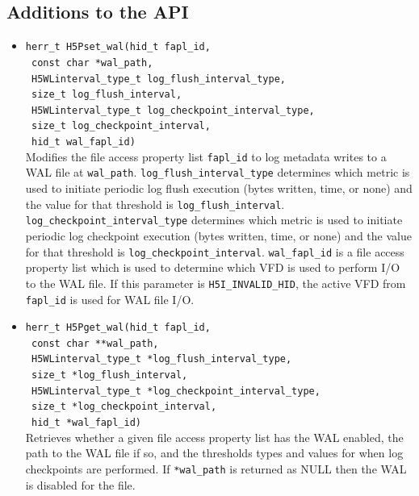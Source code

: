\subsection{Additions to the API}

\begin{itemize}
    \item \texttt{herr\_t H5Pset\_wal(hid\_t fapl\_id,} \\
    \texttt{ const char *wal\_path,} \\
    \texttt{ H5WLinterval\_type\_t log\_flush\_interval\_type,} \\
    \texttt{ size\_t log\_flush\_interval,} \\
    \texttt{ H5WLinterval\_type\_t log\_checkpoint\_interval\_type,} \\
    \texttt{ size\_t log\_checkpoint\_interval,} \\
    \texttt{ hid\_t wal\_fapl\_id)} \\
    Modifies the file access property list \texttt{fapl\_id} to log metadata writes to a WAL file at \texttt{wal\_path}. \texttt{log\_flush\_interval\_type} determines which metric is used to initiate periodic log flush execution (bytes written, time, or none) and the value for that threshold is \texttt{log\_flush\_interval}. \texttt{log\_checkpoint\_interval\_type} determines which metric is used to initiate periodic log checkpoint execution (bytes written, time, or none) and the value for that threshold is \texttt{log\_checkpoint\_interval}. \texttt{wal\_fapl\_id} is a file access property list which is used to determine which VFD is used to perform I/O to the WAL file. If this parameter is \texttt{H5I\_INVALID\_HID}, the active VFD from \texttt{fapl\_id} is used for WAL file I/O.

    \item \texttt{herr\_t H5Pget\_wal(hid\_t fapl\_id,} \\
    \texttt{ const char **wal\_path,} \\
    \texttt{ H5WLinterval\_type\_t *log\_flush\_interval\_type,} \\
    \texttt{ size\_t *log\_flush\_interval,} \\
    \texttt{ H5WLinterval\_type\_t *log\_checkpoint\_interval\_type,} \\
    \texttt{ size\_t *log\_checkpoint\_interval,} \\
    \texttt{ hid\_t *wal\_fapl\_id)} \\
    Retrieves whether a given file access property list has the WAL enabled, the path to the WAL file if so, and the thresholds types and values for when log checkpoints are performed. If \texttt{*wal\_path} is returned as NULL then the WAL is disabled for the file.


\end{itemize}
